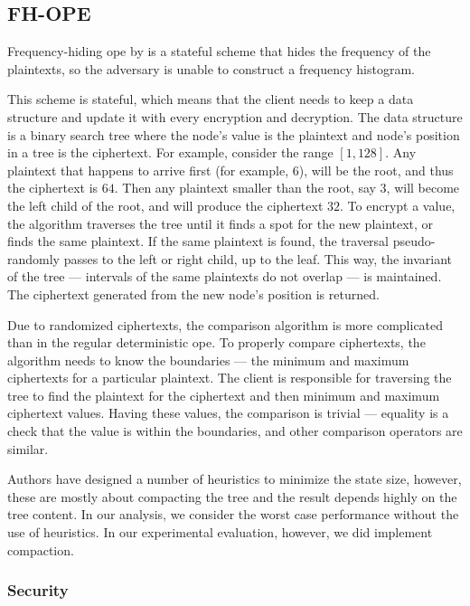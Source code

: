 \subsection{FH-OPE}

	Frequency-hiding \acrshort{ope} by \textcite{fh-ope} is a stateful scheme that hides the frequency of the plaintexts, so the adversary is unable to construct a frequency histogram.

	This scheme is stateful, which means that the client needs to keep a data structure and update it with every encryption and decryption.
	The data structure is a binary search tree where the node's value is the plaintext and node's position in a tree is the ciphertext.
	For example, consider the range $[1, 128]$.
	Any plaintext that happens to arrive first (for example, $6$), will be the root, and thus the ciphertext is $64$.
	Then any plaintext smaller than the root, say $3$, will become the left child of the root, and will produce the ciphertext $32$.
	To encrypt a value, the algorithm traverses the tree until it finds a spot for the new plaintext, or finds the same plaintext.
	If the same plaintext is found, the traversal pseudo-randomly passes to the left or right child, up to the leaf.
	This way, the invariant of the tree --- intervals of the same plaintexts do not overlap --- is maintained.
	The ciphertext generated from the new node's position is returned.

	Due to randomized ciphertexts, the comparison algorithm is more complicated than in the regular deterministic \acrshort{ope}.
	To properly compare ciphertexts, the algorithm needs to know the boundaries --- the minimum and maximum ciphertexts for a particular plaintext.
	The client is responsible for traversing the tree to find the plaintext for the ciphertext and then minimum and maximum ciphertext values.
	Having these values, the comparison is trivial --- equality is a check that the value is within the boundaries, and other comparison operators are similar.

	Authors have designed a number of heuristics to minimize the state size, however, these are mostly about compacting the tree and the result depends highly on the tree content.
	In our analysis, we consider the worst case performance without the use of heuristics.
	In our experimental evaluation, however, we did implement compaction.

	\subsubsection{Security}

